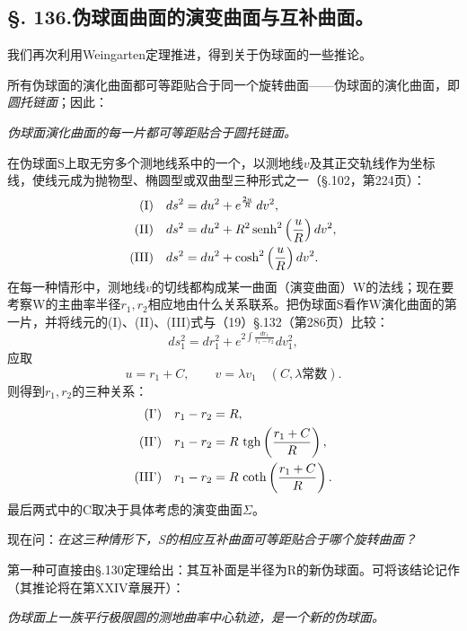 \subsection*{\S. 136.\quad 伪球面曲面的演变曲面与互补曲面。}

我们再次利用Weingarten定理推进，得到关于伪球面的一些推论。

所有伪球面的演化曲面都可等距贴合于同一个旋转曲面——伪球面的演化曲面，即\emph{圆托链面}；因此：

\emph{伪球面演化曲面的每一片都可等距贴合于圆托链面。}

在伪球面S上取无穷多个测地线系中的一个，以测地线\(v\)及其正交轨线作为坐标线，使线元成为抛物型、椭圆型或双曲型三种形式之一（\S.102，第224页）：
\[
\begin{aligned}
\text{(I)}\quad &ds^2=du^2+e^{\frac{2u}{R}}\,dv^2,\\
\text{(II)}\quad &ds^2=du^2+R^2\operatorname{senh}^2\left(\frac uR\right)dv^2,\\
\text{(III)}\quad &ds^2=du^2+\cosh^2\left(\frac uR\right)dv^2.
\end{aligned}
\]
在每一种情形中，测地线\(v\)的切线都构成某一曲面（演变曲面）W的法线；现在要考察W的主曲率半径\(r_1,r_2\)相应地由什么关系联系。把伪球面S看作W演化曲面的第一片，并将线元的(I)、(II)、(III)式与（19）\S.132（第286页）比较：
\[
 ds_1^2=dr_1^2+e^{2\int\frac{dr_1}{r_1-r_2}}dv_1^2,
\]
应取
\[
 u=r_1+C,
 \qquad
 v=\lambda v_1\quad(C,\lambda\text{常数}).
\]
则得到\(r_1,r_2\)的三种关系：
\[
\begin{aligned}
\text{(I')}\quad &r_1-r_2=R,\\
\text{(II')}\quad &r_1-r_2=R\,\operatorname{tgh}\left(\frac{r_1+C}{R}\right),\\
\text{(III')}\quad &r_1-r_2=R\,\operatorname{coth}\left(\frac{r_1+C}{R}\right).
\end{aligned}
\]
最后两式中的C取决于具体考虑的演变曲面\(\Sigma\)。

现在问：\emph{在这三种情形下，S的相应互补曲面可等距贴合于哪个旋转曲面？}

第一种可直接由\S.130定理给出：其互补面是半径为R的新伪球面。可将该结论记作（其推论将在第XXIV章展开）：

\emph{伪球面上一族平行极限圆的测地曲率中心轨迹，是一个新的伪球面。}

